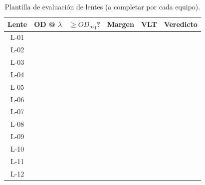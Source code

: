 \documentclass[12pt,a4paper]{article}
\begin{document}
\begin{table}[H]
	\centering
	\caption{Plantilla de evaluación de lentes (a completar por cada equipo).}
	\label{tab:eval_template}
	\small
	\begin{tabular}{c c c c c l}
		\toprule
		\textbf{Lente} & \textbf{OD @ $\lambda$} & \textbf{$\ge OD_{\mathrm{req}}$?}
		               & \textbf{Margen}         & \textbf{VLT}                      & \textbf{Veredicto}      \\
		\midrule
		L-01           &                         &                                   &                    &  & \\
		L-02           &                         &                                   &                    &  & \\
		L-03           &                         &                                   &                    &  & \\
		L-04           &                         &                                   &                    &  & \\
		L-05           &                         &                                   &                    &  & \\
		L-06           &                         &                                   &                    &  & \\
		L-07           &                         &                                   &                    &  & \\
		L-08           &                         &                                   &                    &  & \\
		L-09           &                         &                                   &                    &  & \\
		L-10           &                         &                                   &                    &  & \\
		L-11           &                         &                                   &                    &  & \\
		L-12           &                         &                                   &                    &  & \\
		\bottomrule
	\end{tabular}
\end{table}
\end{document}
